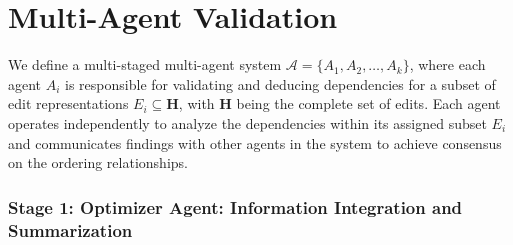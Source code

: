 

\section{Multi-Agent Validation}

We define a multi-staged multi-agent system \( \mathcal{A} = \{ A_1, A_2, \dots, A_k \} \), where each agent \( A_i \) is responsible for validating and deducing dependencies for a subset of edit representations \( E_i \subseteq \mathbf{H} \), with \( \mathbf{H} \) being the complete set of edits. Each agent operates independently to analyze the dependencies within its assigned subset \( E_i \) and communicates findings with other agents in the system to achieve consensus on the ordering relationships.

\subsubsection{Stage 1: Optimizer Agent: Information Integration and Summarization}






